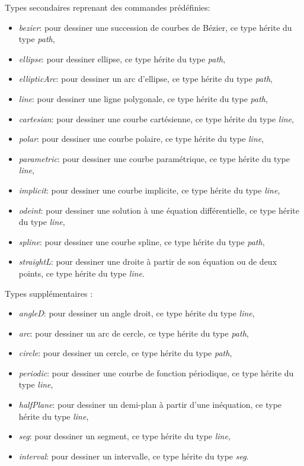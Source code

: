 Types secondaires reprenant des commandes prédéfinies:
\begin{itemize}
 \item \emph{bezier}: pour dessiner une succession de courbes de Bézier, ce type hérite du type \emph{path},
 \item \emph{ellipse}: pour dessiner ellipse, ce type hérite du type \emph{path},
 \item \emph{ellipticArc}: pour dessiner un arc d'ellipse, ce type hérite du type \emph{path},
 \item \emph{line}: pour dessiner une ligne polygonale, ce type hérite du type \emph{path},
 \item \emph{cartesian}: pour dessiner une courbe cartésienne, ce type hérite du type \emph{line},
 \item \emph{polar}: pour dessiner une courbe polaire, ce type hérite du type \emph{line},
 \item \emph{parametric}: pour dessiner une courbe paramétrique, ce type hérite du type \emph{line},
 \item \emph{implicit}: pour dessiner une courbe implicite, ce type hérite du type \emph{line},
 \item \emph{odeint}: pour dessiner une solution à une équation différentielle, ce type hérite du type \emph{line},
 \item \emph{spline}: pour dessiner une courbe spline, ce type hérite du type \emph{path},
 \item \emph{straightL}: pour dessiner une droite à partir de son équation ou de deux points, ce type hérite du type \emph{line}.
\end{itemize}

Types supplémentaires :
\begin{itemize}
 \item \emph{angleD}: pour dessiner un angle droit, ce type hérite du type \emph{line},
 \item \emph{arc}: pour dessiner un arc de cercle, ce type hérite du type \emph{path},
 \item \emph{circle}: pour dessiner un cercle, ce type hérite du type \emph{path},
 \item \emph{periodic}: pour dessiner une courbe de fonction périodique, ce type hérite du type \emph{line},
 \item \emph{halfPlane}: pour dessiner un demi-plan à partir d'une inéquation, ce type hérite du type \emph{line},
 \item \emph{seg}: pour dessiner un segment, ce type hérite du type \emph{line},
 \item \emph{interval}: pour dessiner un intervalle, ce type hérite du type \emph{seg}.
\end{itemize}

